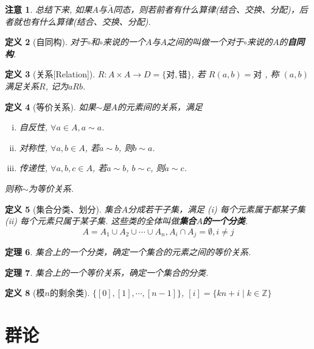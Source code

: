 \documentclass[UTF8]{ctexart}
\newtheorem{Definition}{定义}%
\newtheorem{Theorem}[Definition]{定理}
\newtheorem{Remark}[Definition]{注意}
\begin{document}
\begin{Remark}
总结下来, 如果$A$与$\bar{A}$同态，则若前者有什么算律(结合、交换、分配)，后者就也有什么算律(结合、交换、分配).
\end{Remark}

\begin{Definition}[自同构]
对于$\circ$和$\circ$来说的一个$A$与$A$之间的\;\;叫做一个对于$\circ$来说的$A$的\textbf{自同构}.
\end{Definition}

\begin{Definition}[关系\mbox{[Relation]}]
$R: A \times A \rightarrow D = \{\text{对}, \text{错}\} $, 
若
$R(a, b) = \text{对}$
, 称
$(a, b)$
满足关系$R$, 记为$aRb$.
\end{Definition}

\begin{Definition}[等价关系]
如果$\sim$是$A$的元素间的关系，满足 
\begin{enumerate}[i)]
\item 自反性, $\forall a \in A, a \sim a$.
\item 对称性, $\forall a, b \in A$, 若$a \sim b$, 则$b \sim a$.
\item 传递性, $\forall a, b, c \in A$, 若$a \sim b$, $b\sim c$, 则$a \sim c$.
\end{enumerate}
则称$\sim$为等价关系.
\end{Definition}

\begin{Definition}[集合分类、划分]
集合$A$分成若干子集，满足 (i) 每个元素属于都某子集 (ii) 每个元素只属于某子集. 这些类的全体叫做\textbf{集合$A$的一个分类}.
$$ A = A_1 \cup A_2 \cup \cdots \cup A_n, A_i \cap A_j = \emptyset, i \neq j$$
\end{Definition}

\begin{Theorem}
集合上的一个分类，确定一个集合的元素之间的等价关系.
\end{Theorem}

\begin{Theorem}
集合上的一个等价关系，确定一个集合的分类.
\end{Theorem}

\begin{Definition}[模$n$的剩余类]
$ \{ [0], [1], \cdots, [n-1] \} $, $[i] = \{ k n + i \mid k \in \mathbb{Z} \}$
\end{Definition}


\section{群论}
\end{document}
